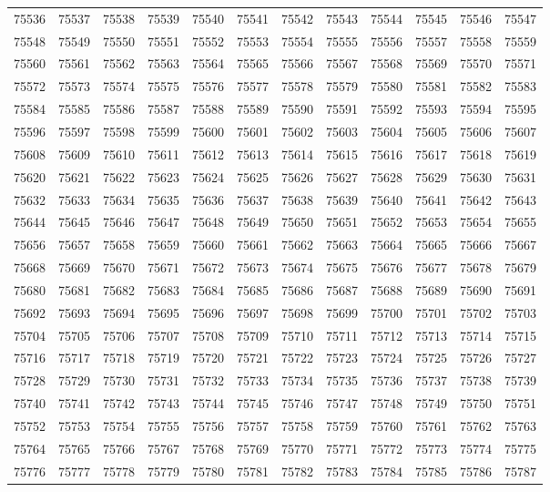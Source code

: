 \begin{center}
\begin{longtable}{llllllllllll}
75536 &75537 &75538 &75539 &75540 &75541 &75542 &75543 &75544 &75545 &75546 &75547 \\
75548 &75549 &75550 &75551 &75552 &75553 &75554 &75555 &75556 &75557 &75558 &75559 \\
75560 &75561 &75562 &75563 &75564 &75565 &75566 &75567 &75568 &75569 &75570 &75571 \\
75572 &75573 &75574 &75575 &75576 &75577 &75578 &75579 &75580 &75581 &75582 &75583 \\
75584 &75585 &75586 &75587 &75588 &75589 &75590 &75591 &75592 &75593 &75594 &75595 \\
75596 &75597 &75598 &75599 &75600 &75601 &75602 &75603 &75604 &75605 &75606 &75607 \\
75608 &75609 &75610 &75611 &75612 &75613 &75614 &75615 &75616 &75617 &75618 &75619 \\
75620 &75621 &75622 &75623 &75624 &75625 &75626 &75627 &75628 &75629 &75630 &75631 \\
75632 &75633 &75634 &75635 &75636 &75637 &75638 &75639 &75640 &75641 &75642 &75643 \\
75644 &75645 &75646 &75647 &75648 &75649 &75650 &75651 &75652 &75653 &75654 &75655 \\
75656 &75657 &75658 &75659 &75660 &75661 &75662 &75663 &75664 &75665 &75666 &75667 \\
75668 &75669 &75670 &75671 &75672 &75673 &75674 &75675 &75676 &75677 &75678 &75679 \\
75680 &75681 &75682 &75683 &75684 &75685 &75686 &75687 &75688 &75689 &75690 &75691 \\
75692 &75693 &75694 &75695 &75696 &75697 &75698 &75699 &75700 &75701 &75702 &75703 \\
75704 &75705 &75706 &75707 &75708 &75709 &75710 &75711 &75712 &75713 &75714 &75715 \\
75716 &75717 &75718 &75719 &75720 &75721 &75722 &75723 &75724 &75725 &75726 &75727 \\
75728 &75729 &75730 &75731 &75732 &75733 &75734 &75735 &75736 &75737 &75738 &75739 \\
75740 &75741 &75742 &75743 &75744 &75745 &75746 &75747 &75748 &75749 &75750 &75751 \\
75752 &75753 &75754 &75755 &75756 &75757 &75758 &75759 &75760 &75761 &75762 &75763 \\
75764 &75765 &75766 &75767 &75768 &75769 &75770 &75771 &75772 &75773 &75774 &75775 \\
75776 &75777 &75778 &75779 &75780 &75781 &75782 &75783 &75784 &75785 &75786 &75787 \\

\end{longtable}
\end{center}
